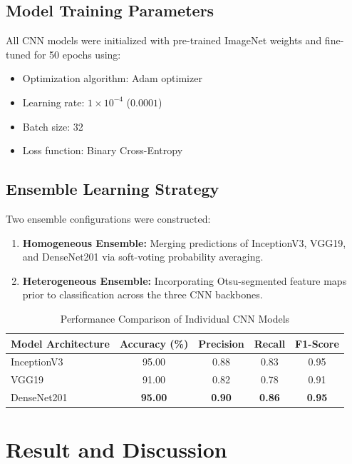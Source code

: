 \documentclass[conference]{IEEEtran}
\begin{document}
\subsection{Model Training Parameters}
All CNN models were initialized with pre-trained ImageNet weights and fine-tuned for 50 epochs using:
\begin{itemize}
    \item Optimization algorithm: Adam optimizer
    \item Learning rate: $1 \times 10^{-4}$ ($0.0001$)
    \item Batch size: 32
    \item Loss function: Binary Cross-Entropy
\end{itemize}

\subsection{Ensemble Learning Strategy}
Two ensemble configurations were constructed:
\begin{enumerate}
    \item \textbf{Homogeneous Ensemble:} Merging predictions of InceptionV3, VGG19, and DenseNet201 via soft-voting probability averaging.
    \item \textbf{Heterogeneous Ensemble:} Incorporating Otsu-segmented feature maps prior to classification across the three CNN backbones.
\end{enumerate}

\begin{table}[htbp]
\caption{Performance Comparison of Individual CNN Models}
\label{tab:individual}
\centering
\begin{tabular}{lcccc}
\toprule
\textbf{Model Architecture} & \textbf{Accuracy (\%)} & \textbf{Precision} & \textbf{Recall} & \textbf{F1-Score} \\
\midrule
InceptionV3 & 95.00 & 0.88 & 0.83 & 0.95 \\
VGG19 & 91.00 & 0.82 & 0.78 & 0.91 \\
DenseNet201 & \textbf{95.00} & \textbf{0.90} & \textbf{0.86} & \textbf{0.95} \\
\bottomrule
\end{tabular}
\end{table}

\section{Result and Discussion}
\end{document}
